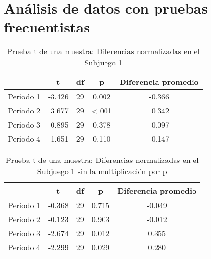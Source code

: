
\chapter{Análisis de datos con pruebas frecuentistas} %

\label{App_Data} %



\begin{table}[h]
\caption[Prueba t de una muestra: Diferencias normalizadas en el Subjuego 1]{Prueba t de una muestra: Diferencias normalizadas en el Subjuego 1}
\label{DN-S1}
\centering
\begin{tabular}{l | c c c | c}
\toprule
\textbf{} & \textbf{t} & \textbf{df} & \textbf{p} & \textbf{Diferencia promedio}\\
\midrule
Periodo 1 & -3.426 & 29 & 0.002 & -0.366\\
Periodo 2 & -3.677 & 29 & <.001 & -0.342\\
Periodo 3 & -0.895 & 29 & 0.378 & -0.097\\
Periodo 4 & -1.651 & 29 & 0.110 & -0.147\\
\bottomrule
\end{tabular}
\end{table}







\begin{table}[h]
\caption[Prueba t de una muestra: Diferencias normalizadas en el Subjuego 1 sin la multiplicación por p]{Prueba t de una muestra: Diferencias normalizadas en el Subjuego 1 sin la multiplicación por p}
\label{DN-S1}
\centering
\begin{tabular}{l | c c c | c}
\toprule
\textbf{} & \textbf{t} & \textbf{df} & \textbf{p} & \textbf{Diferencia promedio}\\
\midrule
Periodo 1 & -0.368 & 29 & 0.715 & -0.049\\
Periodo 2 & -0.123 & 29 & 0.903 & -0.012\\
Periodo 3 & -2.674 & 29 & 0.012 & 0.355\\
Periodo 4 & -2.299 & 29 & 0.029 & 0.280\\
\bottomrule
\end{tabular}
\end{table}










